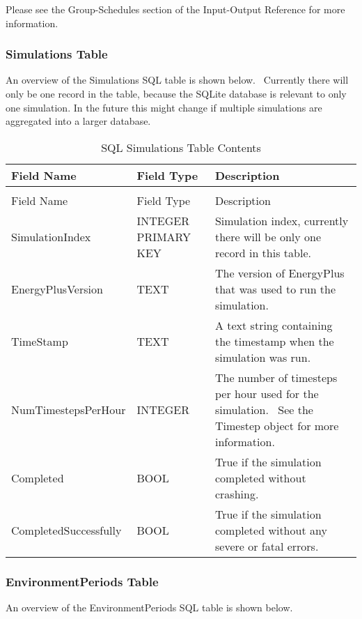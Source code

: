 Please see the Group-Schedules section of the Input-Output Reference for more information.

\subsubsection{Simulations Table}

An overview of the Simulations SQL table is shown below.  Currently there will only be one record in the table, because the SQLite database is relevant to only one simulation. In the future this might change if multiple simulations are aggregated into a larger database.

\begin{longtable}[c]{p{1.5in}p{1.5in}p{3.0in}}
\caption{SQL Simulations Table Contents \label{table:table-36.-sql-simulations-table-contents}} \tabularnewline
\toprule 
Field Name & Field Type & Description \tabularnewline
\midrule
\endfirsthead

\caption[]{SQL Simulations Table Contents} \tabularnewline
\toprule 
Field Name & Field Type & Description \tabularnewline
\midrule
\endhead

SimulationIndex & INTEGER PRIMARY KEY & Simulation index, currently there will be only one record in this table. \tabularnewline
EnergyPlusVersion & TEXT & The version of EnergyPlus that was used to run the simulation. \tabularnewline
TimeStamp & TEXT & A text string containing the timestamp when the simulation was run. \tabularnewline
NumTimestepsPerHour & INTEGER & The number of timesteps per hour used for the simulation.~ See the Timestep object for more information. \tabularnewline
Completed & BOOL & True if the simulation completed without crashing. \tabularnewline
CompletedSuccessfully & BOOL & True if the simulation completed without any severe or fatal errors. \tabularnewline
\bottomrule
\end{longtable}

\subsubsection{EnvironmentPeriods Table}

An overview of the EnvironmentPeriods SQL table is shown below.

